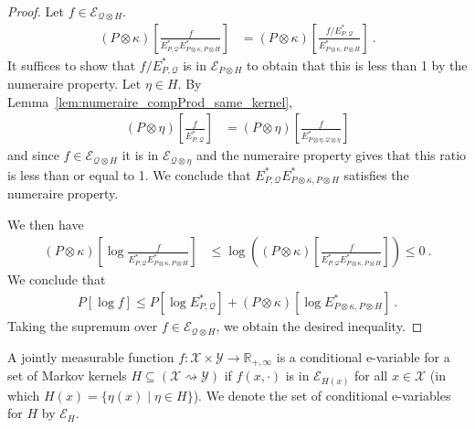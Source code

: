 \begin{proof}
Let $f \in \mathcal{E}_{\mathcal{Q} \otimes H}$.
\begin{align*}
  (P \otimes \kappa)\left[\frac{f}{E^*_{P, \mathcal{Q}}E^*_{P \otimes \kappa, P \otimes H}}\right]
  &= (P \otimes \kappa)\left[\frac{f/E^*_{P, \mathcal{Q}}}{E^*_{P \otimes \kappa, P \otimes H}}\right]
  \: .
\end{align*}
It suffices to show that $f/E^*_{P, \mathcal{Q}}$ is in $\mathcal{E}_{P \otimes H}$ to obtain that this is less than 1 by the numeraire property.
Let $\eta \in H$. By Lemma~\ref{lem:numeraire_compProd_same_kernel},
\begin{align*}
  (P \otimes \eta) \left[\frac{f}{E^*_{P, \mathcal{Q}}}\right]
  &= (P \otimes \eta) \left[\frac{f}{E^*_{P \otimes \eta, \mathcal{Q} \otimes \eta}}\right]
\end{align*}
and since $f \in \mathcal{E}_{\mathcal{Q} \otimes H}$ it is in $\mathcal{E}_{\mathcal{Q} \otimes \eta}$ and the numeraire property gives that this ratio is less than or equal to 1.
We conclude that $E^*_{P, \mathcal{Q}}E^*_{P \otimes \kappa, P \otimes H}$ satisfies the numeraire property.

We then have
\begin{align*}
  (P \otimes \kappa)\left[\log \frac{f}{E^*_{P, \mathcal{Q}}E^*_{P \otimes \kappa, P \otimes H}}\right]
  &\le \log \left( (P \otimes \kappa)\left[\frac{f}{E^*_{P, \mathcal{Q}}E^*_{P \otimes \kappa, P \otimes H}}\right] \right)
  \le 0
  \: .
\end{align*}
We conclude that
\begin{align*}
  P[\log f]
  \le P\left[\log E^*_{P, \mathcal{Q}}\right] + (P \otimes \kappa)\left[\log E^*_{P \otimes \kappa, P \otimes H}\right]
  \: .
\end{align*}
Taking the supremum over $f \in \mathcal{E}_{\mathcal{Q} \otimes H}$, we obtain the desired inequality.
\end{proof}


\begin{definition}\label{def:condEVar}
A jointly measurable function $f : \mathcal{X} \times \mathcal{Y} \to \mathbb{R}_{+, \infty}$ is a conditional e-variable for a set of Markov kernels $H \subseteq (\mathcal{X} \rightsquigarrow \mathcal{Y})$ if $f(x, \cdot)$ is in $\mathcal{E}_{H(x)}$ for all $x \in \mathcal{X}$ (in which $H(x) = \{\eta(x) \mid \eta \in H\}$).
We denote the set of conditional e-variables for $H$ by $\mathcal{E}_H$.
\end{definition}


